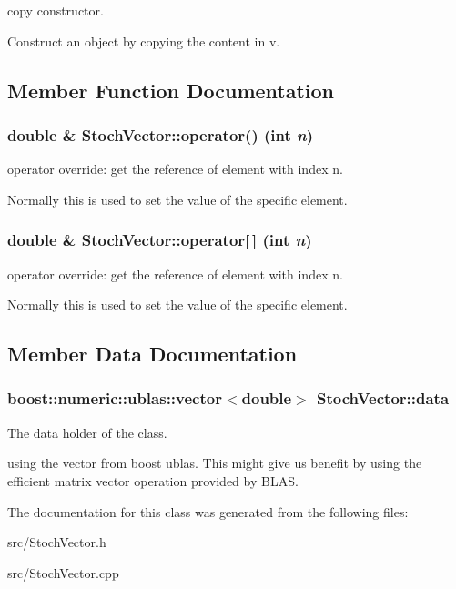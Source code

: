 copy constructor. 

Construct an object by copying the content in v. 

\subsection{Member Function Documentation}
\hypertarget{class_stoch_vector_8d73ab74149f7e7d722c36780f526593}{
\subsubsection{\setlength{\rightskip}{0pt plus 5cm}double \& StochVector::operator() (int {\em n})}}
\label{class_stoch_vector_8d73ab74149f7e7d722c36780f526593}


operator override: get the reference of element with index n. 

Normally this is used to set the value of the specific element. \hypertarget{class_stoch_vector_acb6b0e80a7eed25129e5e7446f59937}{
\subsubsection{\setlength{\rightskip}{0pt plus 5cm}double \& StochVector::operator\mbox{[}$\,$\mbox{]} (int {\em n})}}
\label{class_stoch_vector_acb6b0e80a7eed25129e5e7446f59937}


operator override: get the reference of element with index n. 

Normally this is used to set the value of the specific element. 

\subsection{Member Data Documentation}
\hypertarget{class_stoch_vector_b5a664be6ff1c1be939fba2483d4503b}{
\subsubsection{\setlength{\rightskip}{0pt plus 5cm}boost::numeric::ublas::vector$<$double$>$ {\bf StochVector::data}}}
\label{class_stoch_vector_b5a664be6ff1c1be939fba2483d4503b}


The data holder of the class. 

using the vector from boost ublas. This might give us benefit by using the efficient matrix vector operation provided by BLAS. 

The documentation for this class was generated from the following files:\begin{CompactItemize}
\item 
src/StochVector.h\item 
src/StochVector.cpp\end{CompactItemize}

